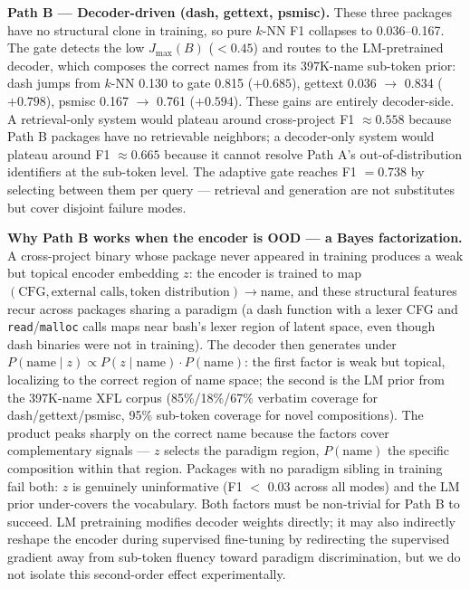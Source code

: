 \documentclass[sigconf,nonacm]{acmart}
\begin{document}
\textbf{Path B --- Decoder-driven (dash, gettext, psmisc).} These three packages have no structural clone in training, so pure $k$-NN F1 collapses to 0.036--0.167. The gate detects the low $J_{\max}(B)$ ($<0.45$) and routes to the LM-pretrained decoder, which composes the correct names from its 397K-name sub-token prior: dash jumps from $k$-NN 0.130 to gate 0.815 ($+0.685$), gettext 0.036 $\to$ 0.834 ($+0.798$), psmisc 0.167 $\to$ 0.761 ($+0.594$). These gains are entirely decoder-side. A retrieval-only system would plateau around cross-project F1 $\approx 0.558$ because Path B packages have no retrievable neighbors; a decoder-only system would plateau around F1 $\approx 0.665$ because it cannot resolve Path A's out-of-distribution identifiers at the sub-token level. The adaptive gate reaches F1 $= 0.738$ by selecting between them per query --- retrieval and generation are not substitutes but cover disjoint failure modes.

\textbf{Why Path B works when the encoder is OOD --- a Bayes factorization.} A cross-project binary whose package never appeared in training produces a weak but topical encoder embedding $z$: the encoder is trained to map $(\text{CFG}, \text{external calls}, \text{token distribution}) \to \text{name}$, and these structural features recur across packages sharing a paradigm (a dash function with a lexer CFG and \texttt{read}/\texttt{malloc} calls maps near bash's lexer region of latent space, even though dash binaries were not in training). The decoder then generates under $P(\text{name} \mid z) \propto P(z \mid \text{name}) \cdot P(\text{name})$: the first factor is weak but topical, localizing to the correct region of name space; the second is the LM prior from the 397K-name XFL corpus (85\%/18\%/67\% verbatim coverage for dash/gettext/psmisc, 95\% sub-token coverage for novel compositions). The product peaks sharply on the correct name because the factors cover complementary signals --- $z$ selects the paradigm region, $P(\text{name})$ the specific composition within that region. Packages with no paradigm sibling in training fail both: $z$ is genuinely uninformative (F1 $<$ 0.03 across all modes) and the LM prior under-covers the vocabulary. Both factors must be non-trivial for Path B to succeed. LM pretraining modifies decoder weights directly; it may also indirectly reshape the encoder during supervised fine-tuning by redirecting the supervised gradient away from sub-token fluency toward paradigm discrimination, but we do not isolate this second-order effect experimentally.
\end{document}
